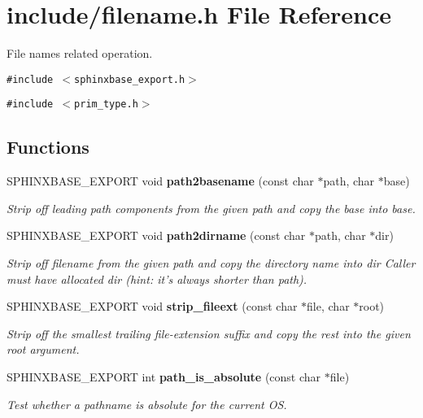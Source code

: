 \section{include/filename.h File Reference}
\label{filename_8h}
File names related operation.  


{\tt \#include $<$sphinxbase\_\-export.h$>$}\par
{\tt \#include $<$prim\_\-type.h$>$}\par
\subsection*{Functions}
\begin{CompactItemize}
\item 
SPHINXBASE\_\-EXPORT void {\bf path2basename} (const char $\ast$path, char $\ast$base)
\begin{CompactList}\small\item\em Strip off leading path components from the given path and copy the base into base. \item\end{CompactList}\item 
SPHINXBASE\_\-EXPORT void {\bf path2dirname} (const char $\ast$path, char $\ast$dir)\label{filename_8h_678be92ddb74695f26a9e4f527b073b0}

\begin{CompactList}\small\item\em Strip off filename from the given path and copy the directory name into dir Caller must have allocated dir (hint: it's always shorter than path). \item\end{CompactList}\item 
SPHINXBASE\_\-EXPORT void {\bf strip\_\-fileext} (const char $\ast$file, char $\ast$root)
\begin{CompactList}\small\item\em Strip off the smallest trailing file-extension suffix and copy the rest into the given root argument. \item\end{CompactList}\item 
SPHINXBASE\_\-EXPORT int {\bf path\_\-is\_\-absolute} (const char $\ast$file)\label{filename_8h_c59add2db73b33e81b354de114268e7a}

\begin{CompactList}\small\item\em Test whether a pathname is absolute for the current OS. \item\end{CompactList}\end{CompactItemize}


